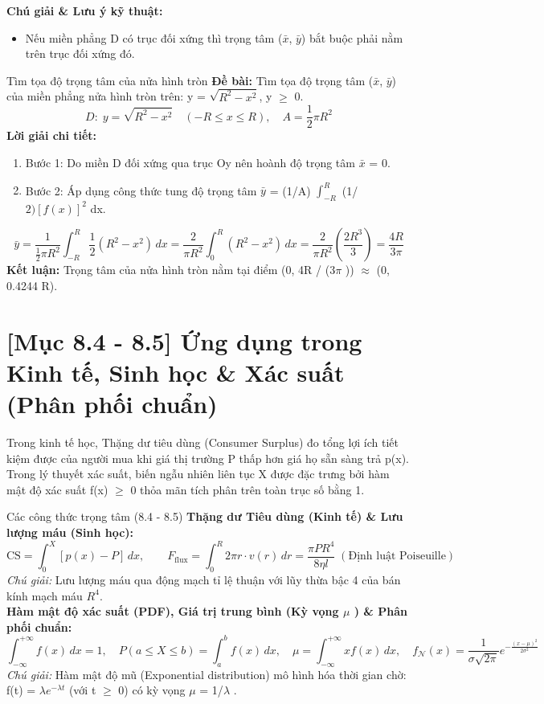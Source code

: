 \documentclass[11pt,a4paper,oneside]{book}
\begin{document}
\noindent\textbf{Chú giải \& Lưu ý kỹ thuật:}
\begin{itemize}[leftmargin=1.5em, itemsep=2pt]
  \item Nếu miền phẳng D có trục đối xứng thì trọng tâm ($\bar{x}$, $\bar{y}$) bắt buộc phải nằm trên trục đối xứng đó.
\end{itemize}

\begin{vidu}{Tìm tọa độ trọng tâm của nửa hình tròn}
\textbf{Đề bài:} Tìm tọa độ trọng tâm ($\bar{x}$, $\bar{y}$) của miền phẳng nửa hình tròn trên: y = $\sqrt{R^2 - x^2}$, y $\ge$ 0.
\[ D: \; y = \sqrt{R^2 - x^2} \quad (-R \le x \le R), \quad A = \frac{1}{2}\pi R^2 \]
\textbf{Lời giải chi tiết:}
\begin{enumerate}[leftmargin=1.5em, itemsep=2pt]
  \item Bước 1: Do miền D đối xứng qua trục Oy nên hoành độ trọng tâm $\bar{x}$ = 0.
  \item Bước 2: Áp dụng công thức tung độ trọng tâm $\bar{y}$ = (1/A) $\int_{-R}^R$ (1/$2)[f(x)]^2$ dx.
\end{enumerate}
\[ \bar{y} = \frac{1}{\frac{1}{2}\pi R^2} \int_{-R}^R \frac{1}{2}(R^2 - x^2)\,dx = \frac{2}{\pi R^2} \int_0^R (R^2 - x^2)\,dx = \frac{2}{\pi R^2}\left(\frac{2R^3}{3}\right) = \frac{4R}{3\pi} \]
\noindent\textbf{Kết luận:} Trọng tâm của nửa hình tròn nằm tại điểm (0, 4R / (3$\pi$ )) $\approx$  (0, 0.4244 R).
\end{vidu}

\section{[Mục 8.4 - 8.5] Ứng dụng trong Kinh tế, Sinh học \& Xác suất (Phân phối chuẩn)}
Trong kinh tế học, Thặng dư tiêu dùng (Consumer Surplus) đo tổng lợi ích tiết kiệm được của người mua khi giá thị trường P thấp hơn giá họ sẵn sàng trả p(x). Trong lý thuyết xác suất, biến ngẫu nhiên liên tục X được đặc trưng bởi hàm mật độ xác suất f(x) $\ge$  0 thỏa mãn tích phân trên toàn trục số bằng 1.

\begin{congthuc}{Các công thức trọng tâm (8.4 - 8.5)}
\noindent\textbf{Thặng dư Tiêu dùng (Kinh tế) \& Lưu lượng máu (Sinh học):}
\[ \text{CS} = \int_0^X [p(x) - P]\,dx, \qquad F_{\text{flux}} = \int_0^R 2\pi r \cdot v(r)\,dr = \frac{\pi P R^4}{8\eta l} \;(\text{Định luật Poiseuille}) \]
\noindent\textit{Chú giải:} Lưu lượng máu qua động mạch tỉ lệ thuận với lũy thừa bậc 4 của bán kính mạch máu $R^4$.\\[4pt]
\noindent\textbf{Hàm mật độ xác suất (PDF), Giá trị trung bình (Kỳ vọng $\mu$ ) \& Phân phối chuẩn:}
\[ \int_{-\infty}^{+\infty} f(x)\,dx = 1, \quad P(a \le X \le b) = \int_a^b f(x)\,dx, \quad \mu = \int_{-\infty}^{+\infty} x f(x)\,dx, \quad f_{\mathcal{N}}(x) = \frac{1}{\sigma\sqrt{2\pi}}e^{-\frac{(x-\mu)^2}{2\sigma^2}} \]
\noindent\textit{Chú giải:} Hàm mật độ mũ (Exponential distribution) mô hình hóa thời gian chờ: f(t) = $\lambda e^{-\lambda t}$ (với t $\ge$  0) có kỳ vọng $\mu$  = 1/$\lambda$ .\\[4pt]
\end{congthuc}
\end{document}
